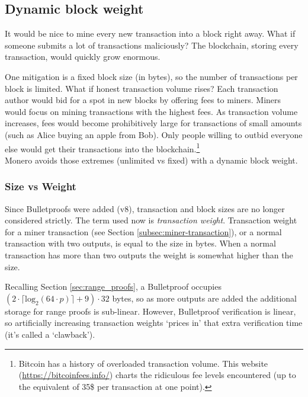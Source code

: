 \subsection{Dynamic block weight}
\label{subsec:dynamic-block-weight}

It would be nice to mine every new transaction into a block right away. What if someone submits a lot of transactions maliciously? The blockchain, storing every transaction, would quickly grow enormous. 

One mitigation is a fixed block size (in bytes), so the number of transactions per block is limited. What if honest transaction volume rises? Each transaction author would bid for a spot in new blocks by offering fees to miners. Miners would focus on mining transactions with the highest fees. As transaction volume increases, fees would become prohibitively large for transactions of small amounts (such as Alice buying an apple from Bob). Only people willing to outbid everyone else would get their transactions into the blockchain.\footnote{Bitcoin has a history of overloaded transaction volume. This website (\url{https://bitcoinfees.info/}) charts the ridiculous fee levels encountered (up to the equivalent of 35\$ per transaction at one point).}\\

Monero avoids those extremes (unlimited vs fixed) with a dynamic block weight.

\subsubsection*{Size vs Weight}

Since Bulletproofs were added (v8), transaction and block sizes are no longer considered strictly. The term used now is {\em transaction weight}. Transaction weight for a miner transaction (see Section \ref{subsec:miner-transaction}), or a normal transaction with two outputs, is equal to the size in bytes. When a normal transaction has more than two outputs the weight is somewhat higher than the size.

Recalling Section \ref{sec:range_proofs}, a Bulletproof occupies $(2 \cdot \lceil \textrm{log}_2(64 \cdot p) \rceil + 9) \cdot 32$ bytes, so as more outputs are added the additional storage for range proofs is sub-linear. However, Bulletproof verification is linear, so artificially increasing transaction weights `prices in' that extra verification time (it's called a `clawback').%

